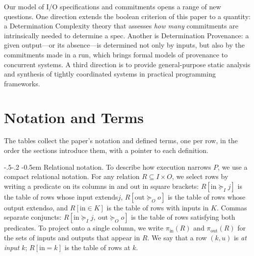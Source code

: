 \documentclass[sigconf]{cidr-2027}
\makeatletter
\theoremstyle{remark}
\renewcommand\paragraph{\@startsection{paragraph}{4}{\z@}%
  {-.5\baselineskip \@plus -2\p@ \@minus -.2\p@}%
  {-0.5em}%
  {\normalfont\bfseries}}
\newcommand{\InputGe}{\succeq_I}
\newcommand{\OutputGe}{\succeq_O}
\newcommand{\commitments}{commitments\xspace}
\newcommand{\inrel}{extends\xspace}          %
\newcommand{\outrel}{extends\xspace}          %
\newcommand{\spectype}[1][]{I/O specification#1\xspace}
\makeatother
\begin{document}
Our model of \spectype[s] and \commitments opens a range of new questions. \textcolor{reviewed}{One direction
extends the boolean criterion of this paper to a quantity: a Determination
Complexity theory that assesses \emph{how many} \commitments are intrinsically
needed to determine a spec.} \textcolor{reviewed}{Another is Determination Provenance: a
given output---or its absence---is determined not only by inputs, but also by
the \commitments made in a run, which brings formal models of provenance to
concurrent systems.} \textcolor{reviewed}{A third direction is to provide general-purpose static
analysis and synthesis of tightly coordinated systems in practical programming frameworks.}


\appendix
\section{Notation and Terms}
\label{app:notation}

The tables collect the paper's notation and defined terms, one per row, in the
order the sections introduce them, with a pointer to each definition.

\paragraph{Relational notation.}
To describe how execution narrows $P$, we use a compact relational notation. For any relation
$R\subseteq I\times O$, we select rows by writing a predicate on its
columns $\mathrm{in}$ and $\mathrm{out}$ in square brackets: $R[\mathrm{in}\InputGe j]$ is the table of rows
whose input \inrel $j$, $R[\mathrm{out}\OutputGe o]$ is the table of rows
whose output \outrel $o$, and $R[\mathrm{in}\in K]$ is
the table of rows with inputs in $K$. Commas separate conjuncts:
$R[\mathrm{in}\InputGe j,\ \mathrm{out}\OutputGe o]$ is the table of rows
satisfying both predicates. To project onto a single column, we write $\pi_{\mathrm{in}}(R)$ and
$\pi_{\mathrm{out}}(R)$ for the sets of inputs and outputs that appear in $R$. We say that a row $(k,u)$ is \emph{at input} $k$; $R[\mathrm{in}=k]$ is the table of
rows at $k$.
\end{document}

